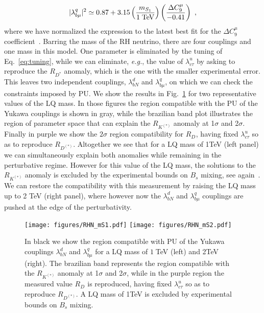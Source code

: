 \documentclass[a4paper,11pt]{article}
\newcommand{\be}{\begin{equation}}
\newcommand{\ee}{\end{equation}}
\begin{document}
\be
|\lambda^q_{b\mu}|^2 \simeq 0.87 + 3.15 \left(\frac{m_{S_1}}{1\;{\rm TeV}} \right)\left(\frac{\Delta C_9^\mu}{-0.41} \right) \ ,
\ee
where we have normalized the expression to the latest best fit for the 
$\Delta C_9^\mu$ coefficient~\cite{Altmannshofer:2021qrr}.
Barring the mass of the RH neutrino, there are four couplings and one mass in this model. One parameter is eliminated by the tuning of Eq.~\eqref{eq:tuning}, while we can eliminate, {\emph{e.g.}}, the value 
of $\lambda^u_{c\tau}$ by asking to reproduce the $R_{D^*}$ anomaly, which is the one with the smaller experimental error. This leaves two independent couplings, $\lambda^d_{bN}$ and $\lambda^q_{b\mu}$, on which we can check the constraints imposed by PU. We show the results in Fig.~\ref{fig:RHnu} for two representative values of the LQ mass. In those figures the region compatible with the PU of the Yukawa couplings is shown in gray, while the brazilian band plot illustrates the region of parameter space that can explain the  $R_{K^{(*)}}$ anomaly at 1$\sigma$ and 2$\sigma$. Finally in purple we show the $2\sigma$ region compatibility for  $R_{D^{}}$, having fixed $\lambda^u_{c\tau}$ so as to reproduce $R_{D^{(*)}}$. Altogether we see that for a LQ mass of 1\;TeV  (left panel) we can simultaneously explain both anomalies while remaining in the perturbative regime. However for this value of the LQ mass, the solutions to the $R_{K^{(*)}}$ anomaly is excluded by the experimental bounds on $B_s$ mixing, see again~\cite{Azatov:2018kzb}. We can restore the compatibility with this measurement by raising the LQ mass up to 2 TeV (right panel), where however now the $\lambda^d_{bN}$ and $\lambda^q_{b\mu}$ couplings are pushed at the edge of the perturbativity.


\begin{figure}[t!]
\begin{center}
\texttt{[image: figures/RHN\_mS1.pdf]}  \hfill
\texttt{[image: figures/RHN\_mS2.pdf]} 
\caption{\small In black we show the region compatible with PU of the Yukawa couplings $\lambda^d_{bN}$ and $\lambda^q_{b\mu}$ for a LQ mass of $1\;$TeV (left) and 2\;TeV (right). The brazilian band represents the region compatible with the $R_{K^{(*)}}$  anomaly at 1$\sigma$ and 2$\sigma$, while in the purple region  the measured value $R_{D^{}}$ is reproduced, having fixed $\lambda^u_{c\tau}$ so as to reproduce $R_{D^{(*)}}$. A LQ mass of 1\;TeV is excluded by experimental bounds on $B_s$ mixing.}
\label{fig:RHnu}
\end{center}
\end{figure}
\end{document}
